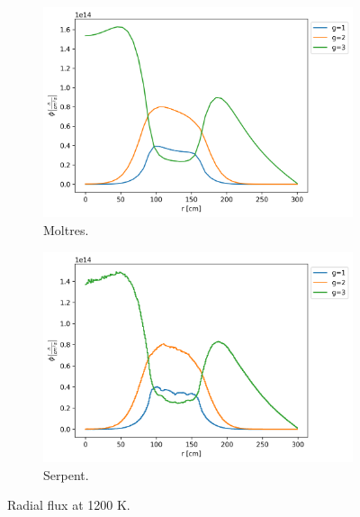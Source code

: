 \documentclass[11pt,letterpaper]{article}
\begin{document}
\begin{figure}[htbp!]
	\centering
	\begin{subfigure}[t]{0.4\textwidth}
		\centering
		\includegraphics[width=\linewidth]{figures-fullcore/3D-fullcore-1200-15Gc-radial1}
		\caption{Moltres.}
	\end{subfigure}
	\begin{subfigure}[t]{0.4\textwidth}
		\centering
		\includegraphics[width=\linewidth]{figures-fullcore/serpent26G-1200-collapse-Radial}
		\caption{Serpent.}
	\end{subfigure}
	\hfill
	\caption{Radial flux at 1200 K.}
	\label{fig:fullcore-1200-radial1}
\end{figure}

\pagebreak


\end{document}
